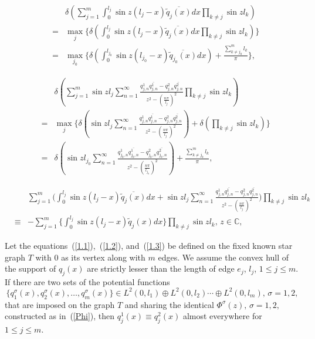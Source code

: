 \documentclass[10pt,a4paper]{amsart}
\begin{document}
\begin{eqnarray}\nonumber
&&\delta(\sum_{j=1}^{m}\int_{0}^{l_{j}}\sin{z(l_{j}-x)}\overline{\widetilde{q}_{j}(x)}dx\prod_{k\neq j}\sin{z l_{k}})\\
&=&\max_{j}\{\delta(\int_{0}^{l_{j}}\sin{z(l_{j}-x)}\overline{\widetilde{q}_{j}(x)}dx\prod_{k\neq j}\sin{z l_{k}})\}\\
&=&\max_{j_{0}}\{\delta(\int_{0}^{l_{j_{0}}}\sin{z(l_{j_{0}}-x)}\overline{\widetilde{q}_{j_{0}}(x)}dx)+\frac{\sum_{k\neq j_{0}}^{m}l_{k}}{\pi}\},\label{3.6}
\end{eqnarray}

\begin{eqnarray}\nonumber
&&\delta(\sum_{j=1}^{m}\sin{z l_{j}}\sum_{n=1}^{\infty}\frac{q^{1}_{j,n}\overline{q^{1}_{j,n}}-q^{2}_{j,n}\overline{q^{2}_{j,n}}}{z^{2}-(\frac{n\pi}{l_{j}})^{2}}\prod_{k\neq j}\sin{z l_{k}})\\
&=&\max_{j}\{\delta(\sin{z l_{j}}\sum_{n=1}^{\infty}\frac{q^{1}_{j,n}\overline{q^{1}_{j,n}}-q^{2}_{j,n}\overline{q^{2}_{j,n}}}{z^{2}-(\frac{n\pi}{l_{j}})^{2}})+\delta(\prod_{k\neq j}\sin{z l_{k}})\}\\
&=&\delta(\sin{z l_{j_{0}}}\sum_{n=1}^{\infty}\frac{q^{1}_{j_{0},n}\overline{q^{1}_{j_{0},n}}-q^{2}_{j_{0},n}\overline{q^{2}_{j_{0},n}}}{z^{2}-(\frac{n\pi}{l_{j_{0}}})^{2}})+\frac{\sum_{k\neq j_{0}}^{m}l_{k}}{\pi},\label{3.7}
\end{eqnarray}

\begin{eqnarray}\nonumber
&&\sum_{j=1}^{m}\Big(\int_{0}^{l_{j}}\sin{z(l_{j}-x)}\overline{\widetilde{q}_{j}(x)}dx+\sin{z l_{j}}\sum_{n=1}^{\infty}\frac{q^{1}_{j,n}\overline{q^{1}_{j,n}}-q^{2}_{j,n}\overline{q^{2}_{j,n}}}{z^{2}-(\frac{n\pi}{l_{j}})^{2}}\Big)\prod_{k\neq j}\sin{z l_{k}}\\
&\equiv&-\sum_{j=1}^{m}\Big\{\int_{0}^{l_{j}}\sin{z(l_{j}-x)}\widetilde{q}_{j}(x)dx\Big\}\prod_{k\neq j}\sin{z l_{k}},\,z\in\mathbb{C},\label{3.11}
\end{eqnarray}

\begin{theorem}
Let the equations~(\ref{1.1}),~(\ref{1.2}), and~(\ref{1.3}) be defined on the fixed known star graph 
$T$ with $0$ as its vertex along with $m$ edges. We assume the convex hull of the support of $q_{j}(x)$ are strictly lesser than the length of edge 
$e_{j}$, $l_{j}$, $1\leq j\leq m$. If there are two sets of the potential functions $$\{q_{1}^{\sigma}(x),q_{2}^{\sigma}(x),\ldots,q_{m}^{\sigma}(x)\}\in L^{2}(0,l_{1})\oplus L^{2}(0,l_{2})\cdots\oplus L^{2}(0,l_{m}),\,\sigma=1,2,$$ that are imposed on the graph $T$ and sharing the identical $\Phi^{\sigma}(z),\,\sigma=1,2,$ constructed as in~(\ref{Phi}), then $q_{j}^{1}(x)\equiv q_{j}^{2}(x)$ almost everywhere for $1\leq j\leq m$.
\end{theorem}
\end{document}
